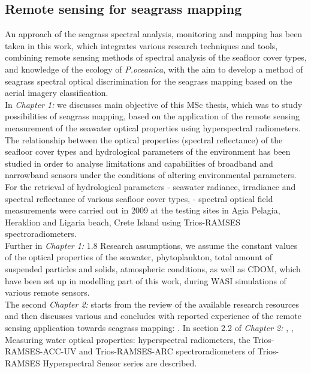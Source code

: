 \documentclass[11pt]{article}
\begin{document}
\subsection{Remote sensing for seagrass mapping}
An approach of the seagrass spectral analysis, monitoring and mapping has been taken in this work, which integrates various research techniques and tools, combining remote sensing methods of spectral analysis of the seafloor cover types, and knowledge of the ecology of \textit{P.oceanica}, with the aim to develop a method of seagrass spectral optical discrimination for the seagrass mapping based on the aerial imagery classification.\vspace{1ex}\\
In \textit{Chapter 1:}  we discusses main objective of this MSc thesis, which was to study possibilities of seagrass mapping, based on the application of the remote sensing measurement of the seawater optical properties using hyperspectral radiometers. 
The relationship between the optical properties (spectral reflectance) of the seafloor cover types and hydrological parameters of the environment has been studied in order to analyse limitations and capabilities of broadband and narrowband sensors under the conditions of altering environmental parameters. For the retrieval of hydrological parameters - seawater radiance, irradiance and spectral reflectance of various seafloor cover types, - spectral optical field measurements were carried out in 2009 at the testing sites in Agia Pelagia, Heraklion and Ligaria beach, Crete Island using \ac{Trios-RAMSES} spectroradiometers.\\
Further in \textit{Chapter 1:} 1.8 Research assumptions, we assume the constant values of the optical properties of the seawater, phytoplankton, total amount of suspended particles and solids, atmospheric conditions, as well as \ac{CDOM}, which have been set up in modelling part of this work, during \ac{WASI} simulations of various remote sensors.\vspace{1ex}\\
The second \textit{Chapter 2:}  starts from the review of the available research resources and then discusses various  and concludes with reported experience of the remote sensing application towards seagrass mapping: . In section 2.2 of \textit{Chapter 2:} , , Measuring water optical properties: hyperspectral radiometers, the \ac{Trios-RAMSES}-ACC-\ac{UV} and \ac{Trios-RAMSES}-ARC spectroradiometers of \ac{Trios-RAMSES} Hyperspectral Sensor series are described. \\
\end{document}
